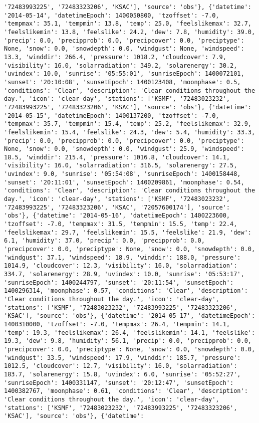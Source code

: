 \documentclass[
  letterpaper,
  DIV=11,
  numbers=noendperiod]{scrartcl}
\begin{document}
\begin{verbatim}
'72483993225', '72483323206', 'KSAC'], 'source': 'obs'}, {'datetime': '2014-05-14', 'datetimeEpoch': 1400050800, 'tzoffset': -7.0, 'tempmax': 35.1, 'tempmin': 13.8, 'temp': 25.0, 'feelslikemax': 32.7, 'feelslikemin': 13.8, 'feelslike': 24.2, 'dew': 7.8, 'humidity': 39.0, 'precip': 0.0, 'precipprob': 0.0, 'precipcover': 0.0, 'preciptype': None, 'snow': 0.0, 'snowdepth': 0.0, 'windgust': None, 'windspeed': 13.3, 'winddir': 266.4, 'pressure': 1018.2, 'cloudcover': 7.9, 'visibility': 16.0, 'solarradiation': 349.2, 'solarenergy': 30.2, 'uvindex': 10.0, 'sunrise': '05:55:01', 'sunriseEpoch': 1400072101, 'sunset': '20:10:08', 'sunsetEpoch': 1400123408, 'moonphase': 0.5, 'conditions': 'Clear', 'description': 'Clear conditions throughout the day.', 'icon': 'clear-day', 'stations': ['KSMF', '72483023232', '72483993225', '72483323206', 'KSAC'], 'source': 'obs'}, {'datetime': '2014-05-15', 'datetimeEpoch': 1400137200, 'tzoffset': -7.0, 'tempmax': 35.7, 'tempmin': 15.4, 'temp': 25.2, 'feelslikemax': 32.9, 'feelslikemin': 15.4, 'feelslike': 24.3, 'dew': 5.4, 'humidity': 33.3, 'precip': 0.0, 'precipprob': 0.0, 'precipcover': 0.0, 'preciptype': None, 'snow': 0.0, 'snowdepth': 0.0, 'windgust': 25.9, 'windspeed': 18.5, 'winddir': 215.4, 'pressure': 1016.8, 'cloudcover': 14.1, 'visibility': 16.0, 'solarradiation': 316.5, 'solarenergy': 27.5, 'uvindex': 9.0, 'sunrise': '05:54:08', 'sunriseEpoch': 1400158448, 'sunset': '20:11:01', 'sunsetEpoch': 1400209861, 'moonphase': 0.54, 'conditions': 'Clear', 'description': 'Clear conditions throughout the day.', 'icon': 'clear-day', 'stations': ['KSMF', '72483023232', '72483993225', '72483323206', 'KSAC', '72057600174'], 'source': 'obs'}, {'datetime': '2014-05-16', 'datetimeEpoch': 1400223600, 'tzoffset': -7.0, 'tempmax': 31.5, 'tempmin': 15.5, 'temp': 22.4, 'feelslikemax': 29.7, 'feelslikemin': 15.5, 'feelslike': 21.9, 'dew': 6.1, 'humidity': 37.0, 'precip': 0.0, 'precipprob': 0.0, 'precipcover': 0.0, 'preciptype': None, 'snow': 0.0, 'snowdepth': 0.0, 'windgust': 37.1, 'windspeed': 18.9, 'winddir': 188.0, 'pressure': 1014.9, 'cloudcover': 12.3, 'visibility': 16.0, 'solarradiation': 334.7, 'solarenergy': 28.9, 'uvindex': 10.0, 'sunrise': '05:53:17', 'sunriseEpoch': 1400244797, 'sunset': '20:11:54', 'sunsetEpoch': 1400296314, 'moonphase': 0.57, 'conditions': 'Clear', 'description': 'Clear conditions throughout the day.', 'icon': 'clear-day', 'stations': ['KSMF', '72483023232', '72483993225', '72483323206', 'KSAC'], 'source': 'obs'}, {'datetime': '2014-05-17', 'datetimeEpoch': 1400310000, 'tzoffset': -7.0, 'tempmax': 26.4, 'tempmin': 14.1, 'temp': 19.3, 'feelslikemax': 26.4, 'feelslikemin': 14.1, 'feelslike': 19.3, 'dew': 9.8, 'humidity': 56.1, 'precip': 0.0, 'precipprob': 0.0, 'precipcover': 0.0, 'preciptype': None, 'snow': 0.0, 'snowdepth': 0.0, 'windgust': 33.5, 'windspeed': 17.9, 'winddir': 185.7, 'pressure': 1012.5, 'cloudcover': 12.7, 'visibility': 16.0, 'solarradiation': 183.7, 'solarenergy': 15.8, 'uvindex': 6.0, 'sunrise': '05:52:27', 'sunriseEpoch': 1400331147, 'sunset': '20:12:47', 'sunsetEpoch': 1400382767, 'moonphase': 0.61, 'conditions': 'Clear', 'description': 'Clear conditions throughout the day.', 'icon': 'clear-day', 'stations': ['KSMF', '72483023232', '72483993225', '72483323206', 'KSAC'], 'source': 'obs'}, {'datetime': 
\end{verbatim}
\end{document}
